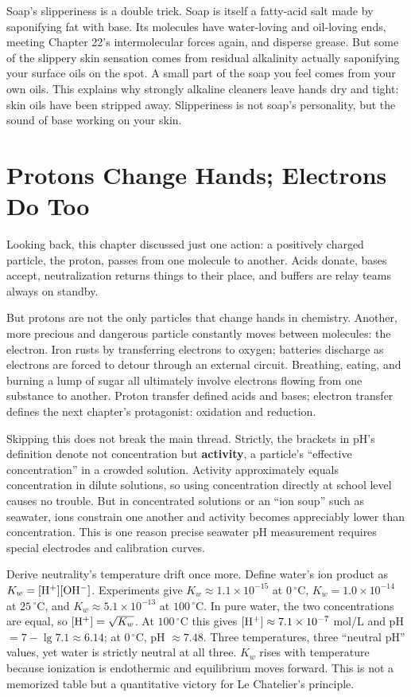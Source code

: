 Soap's slipperiness is a double trick. Soap is itself a fatty-acid salt made by saponifying fat with base. Its molecules have water-loving and oil-loving ends, meeting Chapter 22's intermolecular forces again, and disperse grease. But some of the slippery skin sensation comes from residual alkalinity actually saponifying your surface oils on the spot. A small part of the soap you feel comes from your own oils. This explains why strongly alkaline cleaners leave hands dry and tight: skin oils have been stripped away. Slipperiness is not soap's personality, but the sound of base working on your skin.

\section{Protons Change Hands; Electrons Do Too}

Looking back, this chapter discussed just one action: a positively charged particle, the proton, passes from one molecule to another. Acids donate, bases accept, neutralization returns things to their place, and buffers are relay teams always on standby.

But protons are not the only particles that change hands in chemistry. Another, more precious and dangerous particle constantly moves between molecules: the electron. Iron rusts by transferring electrons to oxygen; batteries discharge as electrons are forced to detour through an external circuit. Breathing, eating, and burning a lump of sugar all ultimately involve electrons flowing from one substance to another. Proton transfer defined acids and bases; electron transfer defines the next chapter's protagonist: oxidation and reduction.

\begin{tiaozhan}
Skipping this does not break the main thread. Strictly, the brackets in pH's definition denote not concentration but \textbf{activity}, a particle's ``effective concentration'' in a crowded solution. Activity approximately equals concentration in dilute solutions, so using concentration directly at school level causes no trouble. But in concentrated solutions or an ``ion soup'' such as seawater, ions constrain one another and activity becomes appreciably lower than concentration. This is one reason precise seawater pH measurement requires special electrodes and calibration curves.

Derive neutrality's temperature drift once more. Define water's ion product as $K_w=[\mathrm{H^+}][\mathrm{OH^-}]$. Experiments give $K_w\approx1.1\times10^{-15}$ at $0\,^{\circ}\mathrm{C}$, $K_w=1.0\times10^{-14}$ at $25\,^{\circ}\mathrm{C}$, and $K_w\approx5.1\times10^{-13}$ at $100\,^{\circ}\mathrm{C}$. In pure water, the two concentrations are equal, so $[\mathrm{H^+}]=\sqrt{K_w}$. At $100\,^{\circ}\mathrm{C}$ this gives $[\mathrm{H^+}]\approx7.1\times10^{-7}$ mol/L and pH $=7-\lg 7.1\approx6.14$; at $0\,^{\circ}\mathrm{C}$, pH $\approx7.48$. Three temperatures, three ``neutral pH'' values, yet water is strictly neutral at all three. $K_w$ rises with temperature because ionization is endothermic and equilibrium moves forward. This is not a memorized table but a quantitative victory for Le Chatelier's principle.
\end{tiaozhan}


